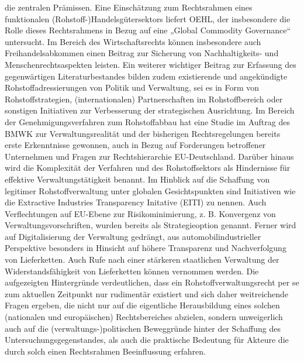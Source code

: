\documentclass[12pt,a4paper,oneside]{book} %
\begin{document}
die zentralen Prämissen.\autocite[4]{dauke_rohstoff-_2011} Eine Einschätzung zum Rechtsrahmen eines funktionalen (Rohstoff-)Handelsgütersektors liefert OEHL, der insbesondere die Rolle dieses Rechtsrahmens in Bezug auf eine „Global Commodity Governance“ untersucht.\autocite{oehl_sustainable_2022} Im Bereich des Wirtschaftsrechts können insbesondere auch Freihandelsabkommen einen Beitrag zur Sicherung von Nachhaltigkeits- und Menschenrechtsaspekten leisten.\autocite[268]{priebe_lithiumabbau_2023}
Ein weiterer wichtiger Beitrag zur Erfassung des gegenwärtigen Literaturbestandes bilden zudem existierende und angekündigte Rohstoffadressierungen von Politik und Verwaltung, sei es in Form von Rohstoffstrategien, (internationalen) Partnerschaften im Rohstoffbereich oder sonstigen Initiativen zur Verbesserung der strategischen Ausrichtung. Im Bereich der Genehmigungsverfahren zum Rohstoffabbau hat eine Studie im Auftrag des BMWK\autocite{pavel_genehmigungsverfahren_2022} zur Verwaltungsrealität und der bisherigen Rechtsregelungen bereits erste Erkenntnisse gewonnen, auch in Bezug auf Forderungen betroffener Unternehmen und Fragen zur Rechtshierarchie EU-Deutschland. Darüber hinaus wird die Komplexität der Verfahren und des Rohstoffsektors als Hindernisse für effektive Verwaltungstätigkeit benannt. Im Hinblick auf die Schaffung von legitimer Rohstoffverwaltung unter globalen Gesichtspunkten sind Initiativen wie die Extractive Industries Transparency Initative (EITI) zu nennen.\autocite{feil_rohstoffkonflikte_2011} Auch Verflechtungen auf EU-Ebene zur Risikominimierung, z. B. Konvergenz von Verwaltungsvorschriften, wurden bereits als Strategieoption genannt.\autocite[47]{feil_rohstoffkonflikte_2011} Ferner wird auf Digitalisierung der Verwaltung gedrängt, aus automobilindustrieller Perspektive besonders in Hinsicht auf höhere Transparenz und Nachverfolgung von Lieferketten.\autocite[41]{kagermann_resilienz_2021} Auch Rufe nach einer stärkeren staatlichen Verwaltung der Widerstandsfähigkeit von Lieferketten können vernommen werden.\autocite{mortsiefer_autobauer_2022}
Die aufgezeigten Hintergründe verdeutlichen, dass ein Rohstoffverwaltungsrecht per se zum aktuellen Zeitpunkt nur rudimentär existiert und sich daher weitreichende Fragen ergeben, die nicht nur auf die eigentliche Herausbildung eines solchen (nationalen und europäischen) Rechtsbereiches abzielen, sondern unweigerlich auch auf die (verwaltungs-)politischen Beweggründe hinter der Schaffung des Untersuchungsgegenstandes, als auch die praktische Bedeutung für Akteure die durch solch einen Rechtsrahmen Beeinflussung erfahren.
\end{document}
